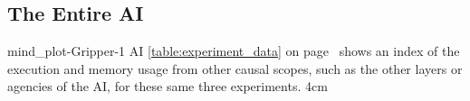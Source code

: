 \newcommand{\experimentdatacommontablereference}{%
  {\mbox{\autoref{table:experiment_data}}} on
  {\mbox{page~\pageref{table:experiment_data}}} shows an index of
  the execution and memory usage from other causal scopes, such as
  the other layers or agencies of the AI, for these same three
  experiments.
}

{\clearpage
  \begin{samepage}
    \subsection{The Entire AI}
    \experimentcausegroupplots{\dataappendixmaxtime}
                              {\dataappendixexperimentonemaxtime}
                              {\dataappendixexperimenttwomaxtime}
                              {\dataappendixexperimentthreemaxtime}
                              {\dataappendixexperimentonename}
                              {\dataappendixexperimenttwoname}
                              {\dataappendixexperimentthreename}
                              {\dataappendixexperimentoneprettyname}
                              {\dataappendixexperimenttwoprettyname}
                              \experimentcausegroupplotscontinued{\dataappendixexperimentthreeprettyname}
                                                                 {mind_plot-Gripper-1}
                                                                 {AI}
                                                                 {\experimentdatacommontablereference}
                                                                 {4cm}
  \end{samepage}
}
